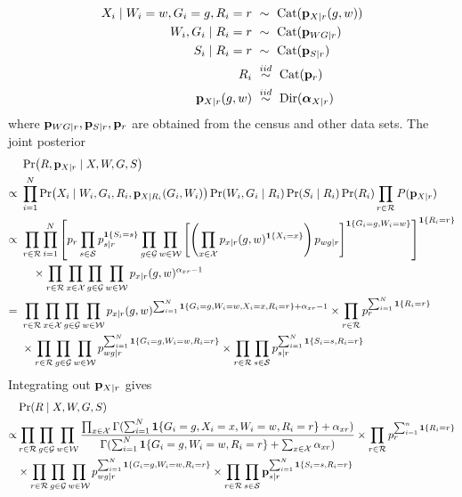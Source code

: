 \documentclass[11pt]{article}
\theoremstyle{plain}
\newcommand{\iid}{\mathrel{\stackrel{iid}{\sim}}}
\newcommand{\Dir}{\mathrm{Dir}}
\newcommand{\Cat}{\mathrm{Cat}}
\newcommand{\cW}{\mathcal{W}}
\newcommand{\cS}{\mathcal{S}}
\newcommand{\cR}{\mathcal{R}}
\newcommand{\cG}{\mathcal{G}}
\newcommand{\cX}{\mathcal{X}}
\begin{document}
\begin{align}
  X_i \mid W_i =w, G_i = g,  R_i = r \ &\sim \ \Cat(\vb p_{X|r}(g,w))  \\
  W_i, G_i \mid R_i  = r \ &\sim \ \Cat(\vb p_{WG|r}) \\
  S_i \mid R_i = r \ &\sim \ \Cat(\vb p_{S|r})  \\
  R_i \ &\iid \ \Cat(\vb p_r) \\
  \vb p_{X|r}(g,w) \ &\iid \ \Dir(\bm\alpha_{X|r})
\end{align}
where $\vb p_{WG|r}, \vb p_{S|r}, \vb p_r$ are obtained from the census and other
data sets.  The joint posterior
\begin{align}
  & \Pr(R, \vb p_{X|r} \mid X, W, G, S) \\
  \propto \ & \prod_{i=1}^N \Pr(X_i \mid W_i, G_i,
  R_i, \vb p_{X|R_i}(G_i, W_i))\Pr(W_i, G_i \mid R_i) \Pr(S_i \mid R_i) \Pr(R_i) \prod_{r
              \in \cR} P(\vb p_{X|r}) \\
  \propto \ & \prod_{r \in \cR} \prod_{i=1}^N  \left[p_r \prod_{s \in \cS}
             p_{s|r}^{\mathbf{1}\{S_i = s\}} \prod_{g \in \cG} \prod_{w \in \cW}
             \left[ \left(\prod_{x \in \cX} p_{x|r}(g,w)^{\mathbf{1}\{X_i = x\}}\right)
              p_{wg|r}\right]^{\mathbf{1}\{G_i = g, W_i =
              w\}} \right]^{\mathbf{1}\{R_i = r\}} \\
  & \quad \times \prod_{r \in \cR} \prod_{x \in \cX} \prod_{g \in \cG}
    \prod_{w \in \cW} p_{x|r}(g,w)^{\alpha_{xr}-1} \\
  = \ &  \prod_{r \in \cR} \prod_{x \in \cX} \prod_{g \in \cG}
    \prod_{w \in \cW} p_{x|r}(g,w)^{\sum_{i=1}^N \mathbf{1}\{G_i = g,
        W_i = w, X_i = x, R_i = r\} + \alpha_{xr}-1} \times \prod_{r
        \in \cR} p_r^{\sum_{i=1}^N \mathbf{1}\{R_i = r\}} \\
  & \times \prod_{r \in \cR} \prod_{g \in \cG}
    \prod_{w \in \cW}p_{wg|r}^{\sum_{i=1}^N \mathbf{1}\{G_i = g,
        W_i = w, R_i = r\}} \times \prod_{r  \in \cR} \prod_{s \in \cS}
    p_{s|r}^{\sum_{i=1}^N \mathbf{1}\{S_i = s, R_i = r\}}
\end{align}
Integrating out $\vb p_{X|r}$ gives
\begin{align}
  &  \Pr(R \mid X, W, G, S) \\
\propto  & \prod_{r \in \cR} \prod_{g \in \cG}
    \prod_{w \in \cW} \frac{\prod_{x \in \cX}\Gamma(\sum_{i=1}^N \mathbf{1}\{G_i =
           g, X_i = x,  W_i = w, R_i = r\} + \alpha_{xr})}{\Gamma(\sum_{i=1}^N
           \mathbf{1}\{G_i = g,
           W_i = w, R_i = r\} + \sum_{x\in\cX} \alpha_{xr})} \times \prod_{r
        \in \cR} p_r^{\sum_{i=1}^n \mathbf{1}\{R_i = r\}} \\
  & \times \prod_{r \in \cR} \prod_{g \in \cG}
    \prod_{w \in \cW}p_{wg|r}^{\sum_{i=1}^N \mathbf{1}\{G_i = g,
        W_i = w, R_i = r\}} \times \prod_{r  \in \cR} \prod_{s \in \cS}
    \vb p_{s|r}^{\sum_{i=1}^N \mathbf{1}\{S_i = s, R_i = r\}}
\end{align}
\end{document}

